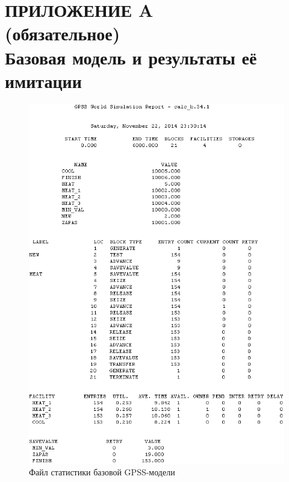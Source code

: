 \renewcommand{\thefigure}{\Asbuk{section}.\arabic{figure}}
\renewcommand{\thetable}{\Asbuk{section}.\arabic{table}}
\renewcommand{\thelstlisting}{\Asbuk{section}.\arabic{lstlisting}}

\section*{ПРИЛОЖЕНИЕ A \\ 
  (обязательное) \\ 
  Базовая модель и результаты её имитации}
\label{sec:appendix_a}

\pagestyle{fancy}
\fancyhf{}  %
\fancyfoot[R]{\thepage}
\renewcommand{\headrulewidth}{0pt}
\renewcommand{\footrulewidth}{0pt}

\setlength{\headheight}{10mm}
\setlength{\headsep}{\baselineskip}

\thispagestyle{plain}

\setcounter{section}{1}
\setcounter{figure}{0}
\setcounter{table}{0}
\setcounter{lstlisting}{0}



\begin{figure}[h!]
  \centering
  \includegraphics[width=150mm]{pic/base_report}
  \caption{Файл статистики базовой GPSS-модели}
  \label{pic:base_report}
\end{figure}

